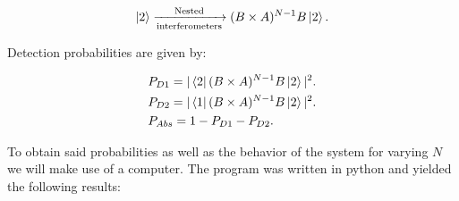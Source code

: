 \documentclass[12pt]{book}
\begin{document}
\begin{equation}\ket{2}\xrightarrow[\text{interferometers}]{\text{Nested}}(B \times A)^{N-1}B \ket{2}.
\end{equation}

Detection probabilities are given by:

\begin{align}
&P_{D1}=|\bra{2} (B \times A)^{N-1}B \ket{2}|^2.\\
&P_{D2}=|\bra{1} (B \times A)^{N-1}B \ket{2}|^2.\\
&P_{Abs}=1-P_{D1}-P_{D2}.
\end{align}
 
 
To obtain said probabilities as well as the behavior of the system for varying $N$ we will make use of a computer. The program was written in python and yielded the following results:
\end{document}
